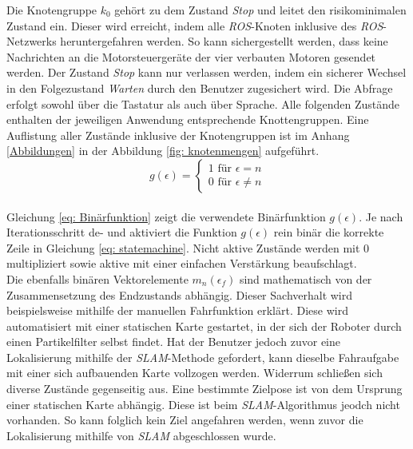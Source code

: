 		Die Knotengruppe $k_0$ gehört zu dem Zustand \textit{Stop} und leitet den risikominimalen Zustand ein. Dieser wird erreicht, indem alle \textit{ROS}-Knoten inklusive des \textit{ROS}-Netzwerks heruntergefahren werden. So kann sichergestellt werden, dass keine Nachrichten an die Motorsteuergeräte der vier verbauten Motoren gesendet werden. Der Zustand \textit{Stop} kann nur verlassen werden, indem ein sicherer Wechsel in den Folgezustand \textit{Warten} durch den Benutzer zugesichert wird. Die Abfrage erfolgt sowohl über die Tastatur als auch über Sprache. Alle folgenden Zustände enthalten der jeweiligen Anwendung entsprechende Knottengruppen. Eine Auflistung aller Zustände inklusive der Knotengruppen ist im Anhang \ref{Abbildungen} in der Abbildung \ref{fig: knotenmengen} aufgeführt.\\ 
	
	\begin{equation}
	g(\epsilon)=\left\{\begin{array}{ll} 1 \text{ für } \epsilon=n \\
	0 \text{ für }\epsilon\neq n\end{array}\right. 
	\label{eq: Binärfunktion}
	\end{equation}\\
		
		Gleichung \ref{eq: Binärfunktion} zeigt die verwendete Binärfunktion $g(\epsilon)$. Je nach Iterationsschritt de- und aktiviert die Funktion $g(\epsilon)$ rein binär die korrekte Zeile in Gleichung \ref{eq: statemachine}. Nicht aktive Zustände werden mit 0 multipliziert sowie aktive mit einer einfachen Verstärkung beaufschlagt. \\
		
		Die ebenfalls binären Vektorelemente $m_n(\epsilon_f)$ sind mathematisch von der Zusammensetzung des Endzustands abhängig. Dieser Sachverhalt wird beispielsweise mithilfe der manuellen Fahrfunktion erklärt. Diese wird automatisiert mit einer statischen Karte gestartet, in der sich der Roboter durch einen Partikelfilter selbst findet. Hat der Benutzer jedoch zuvor eine Lokalisierung mithilfe der \textit{SLAM}-Methode gefordert, kann dieselbe Fahraufgabe mit einer sich aufbauenden Karte vollzogen werden. Widerrum schließen sich diverse Zustände gegenseitig aus. Eine bestimmte Zielpose ist von dem Ursprung einer statischen Karte abhängig. Diese ist beim \textit{SLAM}-Algorithmus jeodch nicht vorhanden. So kann folglich kein Ziel angefahren werden, wenn zuvor die Lokalisierung mithilfe von \textit{SLAM} abgeschlossen wurde.\\
		
